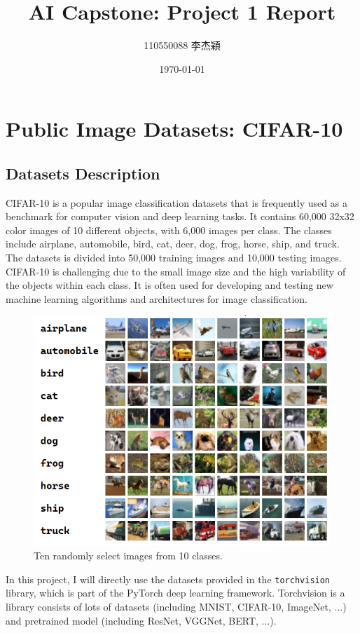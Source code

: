 \documentclass[twocolumn]{extarticle}
\title{AI Capstone: Project 1 Report}
\author{110550088 李杰穎}
\date{\today}
\begin{document}
\maketitle

\section{Public Image Datasets: CIFAR-10}
\subsection{Datasets Description}

CIFAR-10 is a popular image classification datasets that is frequently used as a benchmark for computer vision and deep learning tasks. It contains 60,000 32x32 color images of 10 different objects, with 6,000 images per class. The classes include airplane, automobile, bird, cat, deer, dog, frog, horse, ship, and truck. The datasets is divided into 50,000 training images and 10,000 testing images. CIFAR-10 is challenging due to the small image size and the high variability of the objects within each class. It is often used for developing and testing new machine learning algorithms and architectures for image classification.

\begin{figure}[H]
\centering
\includegraphics[width=0.9\linewidth]{figure/cifar}
\caption{Ten randomly select images from 10 classes.}
\label{fig:cifar}
\end{figure}

In this project, I will directly use the datasets provided in the \texttt{torchvision} library, which is part of the PyTorch deep learning framework. Torchvision is a library consists of lots of datasets (including MNIST, CIFAR-10, ImageNet, ...) and pretrained model (including ResNet, VGGNet, BERT, ...).
\end{document}
